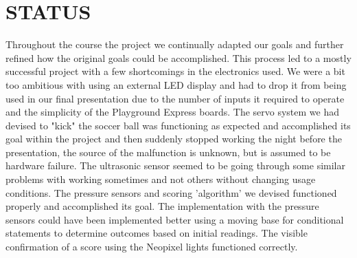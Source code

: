 \documentclass[12pt]{article}
\begin{document}










\section{STATUS}
Throughout the course the project we continually adapted our goals and further refined how the original goals
could be accomplished. This process led to a mostly successful project with a few shortcomings in the 
electronics used. We were a bit too ambitious with using an external LED display and had to drop it from being used in our final presentation due to the number of inputs it required to operate and the simplicity of the Playground Express boards. The servo system we had devised to "kick" the soccer ball was functioning as expected and accomplished its goal within the project and then suddenly stopped working the night before the presentation, the source of the malfunction is unknown, but is assumed to be hardware failure. The ultrasonic sensor seemed to be going through some similar problems with working sometimes and not others without changing usage conditions. The pressure sensors and scoring 'algorithm' we devised functioned properly and accomplished its goal. The implementation with the pressure sensors could have been implemented better using a moving base for conditional statements to determine outcomes based on initial readings. The visible confirmation of a score using the Neopixel lights functioned correctly.
\end{document}
